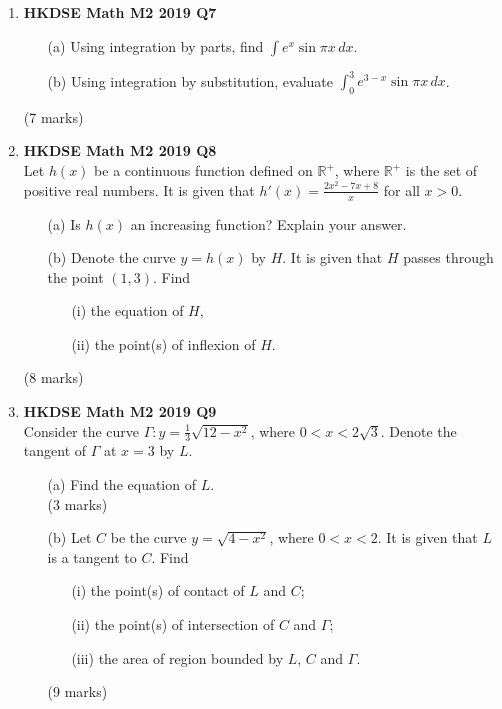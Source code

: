 \documentclass[12pt]{article}
\begin{document}
\begin{enumerate}
	\item \textbf{HKDSE Math M2 2019 Q7}
	\begin{enumerate}
		\item [(a)]Using integration by parts, find $\displaystyle\int e^x\sin{\pi x}\, dx$. 
		\item [(b)]Using integration by substitution, evaluate $\displaystyle\int_{0}^{3} e^{3-x}\sin{\pi x} \,dx$.
	\end{enumerate}
	(7 marks)

	\item \textbf{HKDSE Math M2 2019 Q8}\\
	Let $h(x)$ be a continuous function defined on $\mathbb{R}^+$, where $\mathbb{R}^+$ is the set of positive real numbers. It is given that $\displaystyle h'(x) = \frac{2x^2 -7x+8}{x}$ for all $x > 0$. 
	\begin{enumerate}
		\item [(a)] Is $h(x)$ an increasing function? Explain your answer. 
		\item [(b)] Denote the curve $y = h(x)$ by $H$. It is given that $H$ passes through the point $(1,3)$. Find  
		\begin{enumerate}
			\item [(i)]the equation of $H$,
			\item [(ii)]the point(s) of inflexion of $H$.
		\end{enumerate} 
	\end{enumerate}
	(8 marks)

	\item \textbf{HKDSE Math M2 2019 Q9}\\
	Consider the curve $\Gamma : y = \displaystyle\frac{1}{3}\sqrt{12-x^2}$, where $0<x<2\sqrt{3}$. Denote the tangent of $\Gamma$ at $x = 3$ by $L$.  
	\begin{enumerate}
		\item [(a)]Find the equation of $L$. \\(3 marks)
		\item [(b)]Let $C$ be the curve $y = \sqrt{4-x^2}$, where $0<x<2$. It is given that $L$ is a tangent to $C$. Find 
		\begin{enumerate}
			\item [(i)]the point(s) of contact of $L$ and $C$;  
			\item [(ii)]the point(s) of intersection of $C$ and $\Gamma$;  
			\item [(iii)]the area of region bounded by $L$, $C$ and $\Gamma$.
		\end{enumerate}
		(9 marks)
	\end{enumerate}


\end{enumerate}
\end{document}
